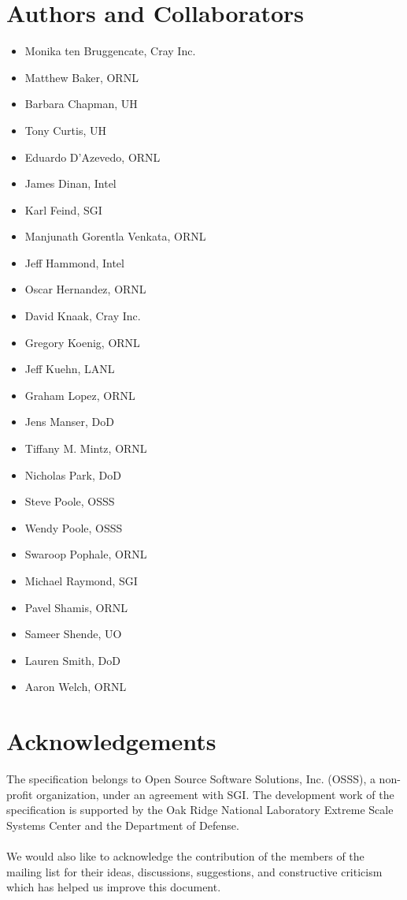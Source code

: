 \section*{Authors and Collaborators}
\begin{itemize}
\item Monika ten Bruggencate, Cray Inc.
\item Matthew Baker, \ac{ORNL}
\item Barbara Chapman, \ac{UH} 
\item Tony Curtis, \ac{UH}
\item Eduardo D'Azevedo, \ac{ORNL}
\item James Dinan, Intel
\item Karl Feind, SGI
\item Manjunath Gorentla Venkata, \ac{ORNL}
\item Jeff Hammond, Intel
\item Oscar Hernandez, \ac{ORNL}
\item David Knaak, Cray Inc.
\item Gregory Koenig, \ac{ORNL}
\item Jeff Kuehn, \ac{LANL}
\item Graham Lopez, \ac{ORNL}
\item Jens Manser, \ac{DoD}
\item Tiffany M. Mintz, \ac{ORNL}
\item Nicholas Park, \ac{DoD}
\item Steve Poole, OSSS
\item Wendy Poole, OSSS
\item Swaroop Pophale, \ac{ORNL}
\item Michael Raymond, SGI
\item Pavel Shamis, \ac{ORNL}
\item Sameer Shende, \ac{UO}
\item Lauren Smith, \ac{DoD}
\item Aaron Welch, \ac{ORNL}

\end{itemize}

\date{\today}

\section*{Acknowledgements}
The \openshmem specification belongs to Open Source Software Solutions, Inc.
(OSSS), a non-profit organization, under an agreement with SGI. The development
work of the specification is supported by the Oak Ridge National Laboratory
Extreme Scale Systems Center and the Department of Defense.\\
\\
We would also like to acknowledge the contribution of the members of the
\openshmem mailing list for their ideas, discussions, suggestions, and
constructive criticism which has helped us improve this document.


